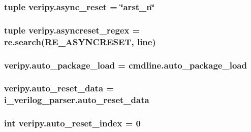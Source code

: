 \hypertarget{namespaceveripy_a65e6d335aa5902f4a18967da2aca2e20}{
\subsubsection[{async\-\_\-reset}]{\setlength{\rightskip}{0pt plus 5cm}tuple veripy.\-async\-\_\-reset = \char`\"{}arst\-\_\-n\char`\"{}}}\label{namespaceveripy_a65e6d335aa5902f4a18967da2aca2e20}
\hypertarget{namespaceveripy_aabfe96ccfbd96d91208eb10df3fad611}{
\subsubsection[{asyncreset\-\_\-regex}]{\setlength{\rightskip}{0pt plus 5cm}tuple veripy.\-asyncreset\-\_\-regex = re.\-search(R\-E\-\_\-\-A\-S\-Y\-N\-C\-R\-E\-S\-E\-T, {\bf line})}}\label{namespaceveripy_aabfe96ccfbd96d91208eb10df3fad611}
\hypertarget{namespaceveripy_a02329512579947b4e050bedace3bc009}{
\subsubsection[{auto\-\_\-package\-\_\-load}]{\setlength{\rightskip}{0pt plus 5cm}veripy.\-auto\-\_\-package\-\_\-load = cmdline.\-auto\-\_\-package\-\_\-load}}\label{namespaceveripy_a02329512579947b4e050bedace3bc009}
\hypertarget{namespaceveripy_aed29c63170d881d76a0845d94c3d6bdd}{
\subsubsection[{auto\-\_\-reset\-\_\-data}]{\setlength{\rightskip}{0pt plus 5cm}veripy.\-auto\-\_\-reset\-\_\-data = i\-\_\-verilog\-\_\-parser.\-auto\-\_\-reset\-\_\-data}}\label{namespaceveripy_aed29c63170d881d76a0845d94c3d6bdd}
\hypertarget{namespaceveripy_a796e24d0f42e97113536ef5675583aa3}{
\subsubsection[{auto\-\_\-reset\-\_\-index}]{\setlength{\rightskip}{0pt plus 5cm}int veripy.\-auto\-\_\-reset\-\_\-index = 0}}\label{namespaceveripy_a796e24d0f42e97113536ef5675583aa3}
